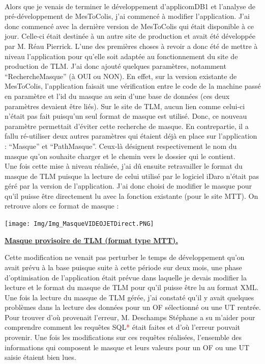 \documentclass[a4paper,12pt]{extarticle}
\newcommand{\espace}{\vspace{0.3cm}}
\newcommand{\alinea}{\hspace*{0.4cm}}
\begin{document}
		\paragraph{}
	
	Alors que je venais de terminer le développement d’applicomDB1 et l’analyse de pré-développement de MesToColis, j’ai commencé à modifier l’application. J’ai donc commencé avec la dernière version de MesToColis qui était disponible à ce jour. Celle-ci était destinée à un autre site de production et avait été développée par M. Réau Pierrick. L’une des premières choses à revoir a donc été de mettre à niveau l’application pour qu’elle soit adaptée au fonctionnement du site de production de TLM. J’ai donc ajouté quelques paramètres, notamment “RechercheMasque” (à OUI ou NON).
En effet, sur la version existante de MesToColis, l’application faisait une vérification entre le code de la machine passé en paramètre et l’id du masque au sein d’une base de données (ces deux paramètres devaient être liés). Sur le site de TLM, aucun lien comme celui-ci n'était pas fait puisqu’un seul format de masque est utilisé. Donc, ce nouveau paramètre permettait d’éviter cette recherche de masque. En contrepartie, il a fallu ré-utiliser deux autres paramètres qui étaient déjà en place sur l’application : “Masque” et “PathMasque”. Ceux-là désignent respectivement le nom du masque qu’on souhaite charger et le chemin vers le dossier qui le contient.\\
\alinea
Une fois cette mise à niveau réalisée, j’ai dû ensuite retravailler le format du masque de TLM puisque la lecture de celui utilisé par le logiciel iDaro n’était pas géré par la version de l’application. J’ai donc choisi de modifier le masque pour qu’il puisse être directement lu avec la fonction existante (pour le site MTT). On retrouve alors ce format de masque : \\

\centerline{\texttt{[image: Img/Img\_MasqueVIDEOJETDirect.PNG]}}
\centerline{\textbf{\underline{Masque provisoire de TLM (format type MTT).}}}
\espace{}

Cette modification ne venait pas perturber le temps de développement qu’on avait prévu à la base puisque suite à cette période sur deux mois, une phase d’optimisation de l’application était prévue dans laquelle je devais modifier la lecture et le format du masque de TLM pour qu’il puisse être lu au format XML. Une fois la lecture du masque de TLM gérée, j’ai constaté qu’il y avait quelques problèmes dans la lecture des données pour un OF sélectionné ou une UT rentrée. Pour trouver d’où provenait l’erreur, M. Deschamps Stéphane a su m’aider pour comprendre comment les requêtes SQL\textcolor{red}{*} était faites et d’où l’erreur pouvait provenir. Une fois les modifications sur ces requêtes réalisées, l’ensemble des informations qui composent le masque et leurs valeurs pour un OF ou une UT saisie étaient bien lues.
\end{document}
